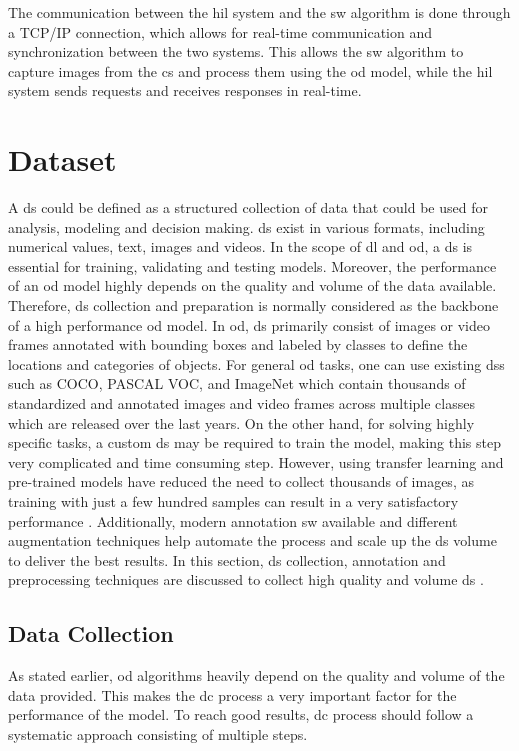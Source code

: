 The communication between the \gls{hil} system and the \gls{sw} algorithm is done through a TCP/IP connection, which allows for real-time communication and synchronization between the two systems. This allows the \gls{sw} algorithm to capture images from the \gls{cs} and process them using the \gls{od} model, while the \gls{hil} system sends requests and receives responses in real-time.


\section{Dataset}
A \gls{ds} could be defined as a structured collection of data that could be used for analysis, modeling and decision making. \gls{ds} exist in various formats, including numerical values, text, images and videos. In the scope of \gls{dl} and \gls{od}, a \gls{ds} is essential for training, validating and testing models. Moreover, the performance of an \gls{od} model highly depends on the quality and volume of the data available. Therefore, \gls{ds} collection and preparation is normally considered as the backbone of a high performance \gls{od} model. In \gls{od}, \gls{ds} primarily consist of images or video frames annotated with bounding boxes and labeled by classes to define the locations and categories of objects. For general \gls{od} tasks, one can use existing \gls{ds}s such as COCO, PASCAL VOC, and ImageNet which contain thousands of standardized and annotated images and video frames across multiple classes which are released over the last years. On the other hand, for solving highly specific tasks, a custom \gls{ds} may be required to train the model, making this step very complicated and time consuming step. However, using transfer learning and pre-trained models have reduced the need to collect thousands of images, as training with just a few hundred samples can result in a very satisfactory performance \cite{IBM_Transfer_Learning}. Additionally, modern annotation \gls{sw} available and different augmentation techniques help automate the process and scale up the \gls{ds} volume to deliver the best results. In this section, \gls{ds} collection, annotation and preprocessing techniques are discussed to collect high quality and volume \gls{ds} \cite{oD_Review}.

\subsection{Data Collection}
As stated earlier, \gls{od} algorithms heavily depend on the quality and volume of the data provided. This makes the \gls{dc} process a very important factor for the performance of the model. To reach good results, \gls{dc} process should follow a systematic approach consisting of multiple steps.

